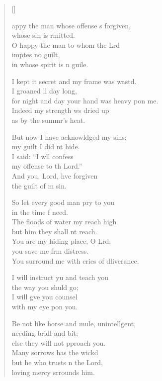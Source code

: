 \settowidth{\versewidth}{for night and day your hand was heavy upon me.}
\begin{verse}[\versewidth]
  \begin{patverse}
appy the man whose offense \pointup{\i}s forgiven,\Med\\
whose sin is rmitted.\\
O happy the man to whom the Lrd\Flex\\
imptes no guilt,\Med\\
in whose spirit is n guile.

I kept it secret and my frame was wastd.\Flex\\
I groaned ll day long,\Med\\
for night and day your hand was heavy pon me.\\
Indeed my strength ws dried up\Med\\
as by the summr’s heat.

But now I have acknowldged my sins;\Med\\
my guilt I did nt hide.\\
I said: “I w\pointup{\i}ll confess\Med\\
my offense to th Lord.”\\
And you, Lord, hve forgiven\Med\\
the guilt of m sin.

So let every good man pry to you\Med\\
in the time f need.\\
The floods of water my reach high\Med\\
but him they shall nt reach.\\
You are my hiding place, O Lrd;\Flex\\
you save me frm distress.\Med\\
You surround me with cries of dliverance.

I will instruct yu and teach you\Med\\
the way you shuld go;\\
I will g\pointup{\i}ve you counsel\Med\\
with my eye pon you.

Be not like horse and mule, unintell\pointup{\i}gent,\Flex\\
needing bridl and bit;\Med\\
else they will not pproach you.\Med\\
Many sorrows has the wickd\\
but he who trusts \pointup{\i}n the Lord,\Med\\
loving mercy srrounds him.


\end{patverse}
\end{verse}
